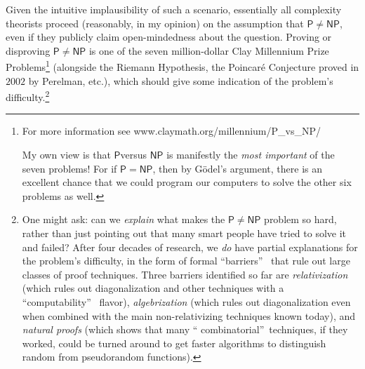 \documentclass[12pt,onecolumn]{article}%
\begin{document}
Given the intuitive implausibility of such a scenario, essentially all
complexity theorists proceed (reasonably, in my opinion) on the assumption
that $\mathsf{P}\neq\mathsf{NP}$, even if they publicly claim open-mindedness
about the question. Proving or disproving $\mathsf{P}\neq\mathsf{NP}$ is
one of the seven million-dollar Clay Millennium Prize Problems\footnote{For
more information see www.claymath.org/millennium/P\_vs\_NP/
\par
My own view is that $\mathsf{P} $versus $\mathsf{NP}$ is manifestly the
\textit{most important} of the seven problems! For if $\mathsf{P}%
=\mathsf{NP}$, then by G\"{o}del's argument, there is an excellent chance that
we could program our computers to solve the other six problems as well.}
(alongside the Riemann Hypothesis, the Poincar\'{e} Conjecture proved in
$2002$ by Perelman, etc.), which should give some indication of the problem's
difficulty.\footnote{One might ask: can we \textit{explain} what makes the
$\mathsf{P}\neq\mathsf{NP}$ problem so hard, rather than just pointing out
that many smart people have tried to solve it and failed? After four decades
of research, we \textit{do} have partial explanations for the problem's
difficulty, in the form of formal \textquotedblleft barriers\textquotedblright\ %
 that rule out large classes of proof techniques. Three barriers identified
so far are \textit{relativization} \cite{bgs} (which rules out diagonalization
and other techniques with a \textquotedblleft computability\textquotedblright\ %
 flavor), \textit{algebrization} \cite{awig} (which rules out diagonalization
even when combined with the main non-relativizing techniques known today), and
\textit{natural proofs} \cite{rr} (which shows that many \textquotedblleft
combinatorial\textquotedblright\  techniques, if they worked, could be turned
around to get faster algorithms to distinguish random from pseudorandom
functions).}
\end{document}

